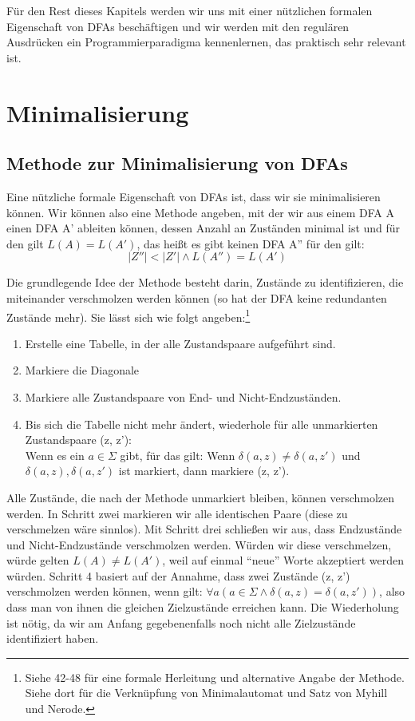 Für den Rest dieses Kapitels
werden wir uns mit einer nützlichen formalen Eigenschaft von DFAs beschäftigen
und wir werden mit den regulären Ausdrücken ein Programmierparadigma kennenlernen,
das praktisch sehr relevant ist.

\section{Minimalisierung}

\subsection{Methode zur Minimalisierung von DFAs}

Eine nützliche formale Eigenschaft von DFAs ist,
dass wir sie minimalisieren können.
Wir können also eine Methode angeben,
mit der wir aus einem DFA A einen DFA A' ableiten können,
dessen Anzahl an Zuständen minimal ist 
und für den gilt $L(A) = L(A')$,
das heißt es gibt keinen DFA A'' für den gilt:
\[|Z''| < |Z'| \wedge L(A'') = L(A') \]

Die grundlegende Idee der Methode besteht darin,
Zustände zu identifizieren,
die miteinander verschmolzen werden können
(so hat der DFA keine redundanten Zustände mehr).
Sie lässt sich wie folgt angeben:\footnote{
    Siehe \cite{schoening} 42-48
    für eine formale Herleitung und alternative Angabe der Methode.
    Siehe dort für die Verknüpfung von Minimalautomat und Satz von Myhill und Nerode.}

\begin{enumerate}
    \item Erstelle eine Tabelle, in der alle Zustandspaare aufgeführt sind.
    \item Markiere die Diagonale 
    \item Markiere alle Zustandspaare von End- und Nicht-Endzuständen.
    \item Bis sich die Tabelle nicht mehr ändert,
        wiederhole für alle unmarkierten Zustandspaare (z, z'):\\
        Wenn es ein $a \in \Sigma$ gibt,
        für das gilt:
        Wenn $\delta(a,z) \neq \delta(a,z')$ und $\delta(a, z), \delta(a, z')$ ist markiert,
        dann markiere (z, z').
\end{enumerate}

Alle Zustände, die nach der Methode unmarkiert bleiben,
können verschmolzen werden.
In Schritt zwei markieren wir alle identischen Paare
(diese zu verschmelzen wäre sinnlos).
Mit Schritt drei schließen wir aus,
dass Endzustände und Nicht-Endzustände verschmolzen werden. 
Würden wir diese verschmelzen,
würde gelten $L(A) \neq L(A')$,
weil auf einmal ``neue'' Worte akzeptiert werden würden.
Schritt 4 basiert auf der Annahme, dass zwei Zustände (z, z') verschmolzen werden können,
wenn gilt: $\forall a(a \in \Sigma \wedge \delta(a, z) = \delta(a, z'))$,
also dass man von ihnen die gleichen Zielzustände erreichen kann.
Die Wiederholung ist nötig,
da wir am Anfang gegebenenfalls noch nicht alle Zielzustände identifiziert haben.


